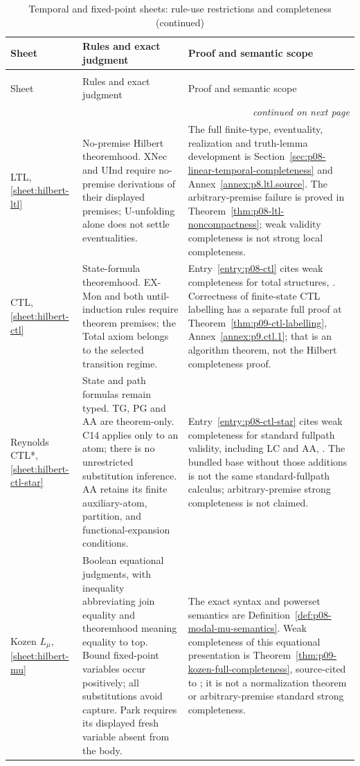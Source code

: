 \begingroup\small
\begin{longtable}{@{}p{.16\linewidth}p{.36\linewidth}p{.40\linewidth}@{}}
\caption{Temporal and fixed-point sheets: rule-use restrictions and completeness.}
\label{tab:p14-nonclassical-temporal}\\
\toprule
Sheet & Rules and exact judgment & Proof and semantic scope \\
\midrule\endfirsthead
\caption[]{Temporal and fixed-point sheets: rule-use restrictions and completeness (continued)}\\
\toprule Sheet & Rules and exact judgment & Proof and semantic scope \\
\midrule\endhead
\midrule\multicolumn{3}{r}{\emph{continued on next page}}\\
\endfoot
\endlastfoot
LTL, \ref{sheet:hilbert-ltl} & No-premise Hilbert theoremhood.
XNec and UInd require no-premise derivations of their displayed premises;
U-unfolding alone does not settle eventualities. & The full finite-type,
eventuality, realization and truth-lemma development is
Section~\ref{sec:p08-linear-temporal-completeness} and
Annex~\ref{annex:p8.ltl.source}. The arbitrary-premise failure is proved in
Theorem~\ref{thm:p08-ltl-noncompactness}; weak validity completeness is
not strong local completeness. \\
\addlinespace
CTL, \ref{sheet:hilbert-ctl} & State-formula theoremhood.
EX-Mon and both until-induction rules require theorem premises; the
Total axiom belongs to the selected transition regime. &
Entry~\ref{entry:p08-ctl} cites weak completeness for total structures,
\cite[\S6]{EmersonHalpern1985}. Correctness of finite-state CTL labelling
has a separate full proof at Theorem~\ref{thm:p09-ctl-labelling},
Annex~\ref{annex:p9.ctl.1}; that is an algorithm theorem, not the Hilbert
completeness proof. \\
\addlinespace
Reynolds CTL*, \ref{sheet:hilbert-ctl-star} & State and path formulas
remain typed. TG, PG and AA are theorem-only. C14 applies only to an atom;
there is no unrestricted substitution inference. AA retains its finite
auxiliary-atom, partition, and functional-expansion conditions. &
Entry~\ref{entry:p08-ctl-star} cites weak completeness for standard
fullpath validity, including LC and AA, \cite{Reynolds2001}. The bundled
base without those additions is not the same standard-fullpath calculus;
arbitrary-premise strong completeness is not claimed. \\
\addlinespace
Kozen \(L_\mu\), \ref{sheet:hilbert-mu} & Boolean equational judgments,
with inequality abbreviating join equality and theoremhood meaning equality
to top. Bound fixed-point variables occur positively; all substitutions
avoid capture. Park requires its displayed fresh variable absent from the
body. & The exact syntax and powerset semantics are
Definition~\ref{def:p08-modal-mu-semantics}. Weak completeness of this
equational presentation is Theorem~\ref{thm:p09-kozen-full-completeness},
source-cited to \cite{Walukiewicz2000}; it is not a normalization theorem
or arbitrary-premise standard strong completeness. \\
\bottomrule
\end{longtable}\endgroup

